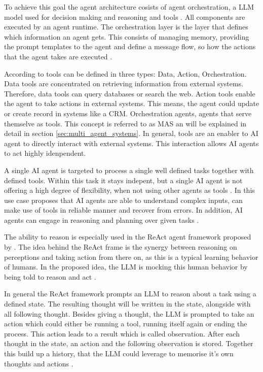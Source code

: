 \documentclass[a4paper,oneside,bibliography=totoc]{scrbook}
\begin{document}
To achieve this goal the agent architecture cosists of agent orchestration, a \ac{LLM} model used for decision making and reasoning and tools \cite{Wiesinger2025,OpenAI2025}. All components are executed by an agent runtime. The orchestration layer is the layer that defines which information an agent gets. This consists of managing memory, providing the prompt templates to the agent and define a message flow, so how the actions that the agent takes are executed \cite{Wiesinger2025}.

According to \citet{OpenAI2025} tools can be defined in three types: Data, Action, Orchestration. Data tools are concentrated on retrieving information from external systems. Therefore, data tools can query databases or search the web. Action tools enable the agent to take actions in external systems. This means, the agent could update or create record in systems like a \ac{CRM}. Orchestration agents, agents that serve themselve as tools. This concept is referred to as \ac{MAS} an will be explained in detail in section \ref{sec:multi_agent_systems}. In general, tools are an enabler to AI agent to directly interact with external systems. This interaction allows \ac{AI} agents to act highly idenpendent.

A single \ac{AI} agent is targeted to process a single well defined tasks together with defined tools. Within this task it stays indepent, but a single \ac{AI} agent is not offering a high degree of flexibility, when not using other agents as tools \cite{Sapkota2025}. In this use case \citet{Anthropic2024} proposes that \ac{AI} agents are able to understand complex inputs, can make use of tools in reliable manner and recover from errors. In addition, \ac{AI} agents can engage in reasoning and planning over given tasks \cite{Anthropic2024}.

The ability to reason is especially used in the ReAct agent framework proposed by \citet{Yao2023}. The idea behind the ReAct frame is the synergy between reasoning on perceptions and taking action from there on, as this is a typical learning behavior of humans. In the proposed idea, the \ac{LLM} is mocking this human behavior by being told to reason and act \cite{Yao2023}.

In general the ReAct framework prompts an \ac{LLM} to reason about a task using a defined state. The resulting thought will be written in the state, alongside with all following thought. Besides giving a thought, the \ac{LLM} is prompted to take an action which could either be running a tool, running itself again or ending the process. This action leads to a result which is called observation. After each thought in the state, an action and the following observation is stored. Together this build up a history, that the \ac{LLM} could leverage to memorise it's own thoughts and actions \cite{Yao2023}.
\end{document}
